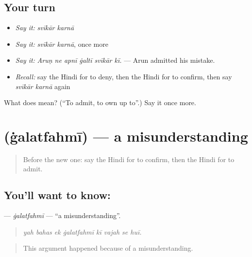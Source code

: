 \subsection*{Your turn}
\begin{itemize}
\raggedright
  \item \emph{Say it:} \emph{svīkār karnā}
  \item \emph{Say it:} \emph{svīkār karnā}, once more
  \item \emph{Say it:} \emph{Aruṇ ne apnī ġaltī svīkār kī.} — Arun admitted his mistake.
  \item \emph{Recall:} say the Hindi for to deny, then the Hindi for to confirm, then say \emph{svīkār karnā} again
\end{itemize}

\begin{tcolorbox}[breakable,colback=teal!4,colframe=teal!35!black,title={Before you move on}]
What does   mean? (\textquotedblleft{}To admit, to own up to\textquotedblright{}.) Say it once more.
\end{tcolorbox}
\section[\texorpdfstring{\hi{ग़लतफ़हमी} (ġalatfahmī)}{ग़लतफ़हमी (ġalatfahmī)}]{ (ġalatfahmī) — a misunderstanding}

\label{lesson:HI-C349-galatfahmi}



\begin{quote}
Before the new one: say the Hindi for to confirm, then the Hindi for to admit.
\end{quote}

\subsection*{You'll want to know: }
\textbf{} — \emph{ġalatfahmī} — \textquotedblleft{}a misunderstanding\textquotedblright{}.

\begin{quote}
       
\end{quote}

\begin{quote}
\emph{yah bahas ek ġalatfahmī kī vajah se huī.}
\end{quote}

\begin{quote}
This argument happened because of a misunderstanding.
\end{quote}

